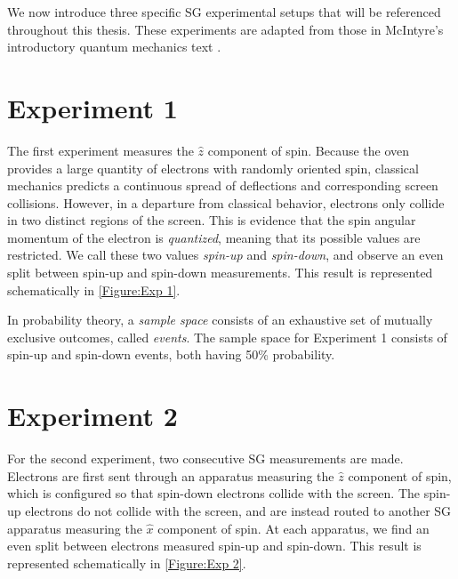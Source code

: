 We now introduce three specific SG experimental setups that will be referenced throughout this thesis. These experiments are adapted from those in McIntyre's introductory quantum mechanics text \cite{mcintyre}.
\section{Experiment 1} \label{og experiment 1}
The first experiment measures the $\hat{z}$ component of spin. Because the oven provides a large quantity of electrons with randomly oriented spin, classical mechanics predicts a continuous spread of deflections and corresponding screen collisions. However, in a departure from classical behavior, electrons only collide in two distinct regions of the screen. This is evidence that the spin angular momentum of the electron is \textit{quantized}, meaning that its possible values are restricted. We call these two values \textit{spin-up} and \textit{spin-down}, and observe an even split between spin-up and spin-down measurements. This result is represented schematically in \autoref{Figure:Exp 1}.

In probability theory, a \textit{sample space} consists of an exhaustive set of mutually exclusive outcomes, called \textit{events}. The sample space for Experiment 1 consists of spin-up and spin-down events, both having 50\% probability.

\section{Experiment 2}

For the second experiment, two consecutive SG measurements are made. Electrons are first sent through an apparatus measuring the $\hat{z}$ component of spin, which is configured so that spin-down electrons collide with the screen. The spin-up electrons do not collide with the screen, and are instead routed to another SG apparatus measuring the $\hat{x}$ component of spin. At each apparatus, we find an even split between electrons measured spin-up and spin-down. This result is represented schematically in \autoref{Figure:Exp 2}.

